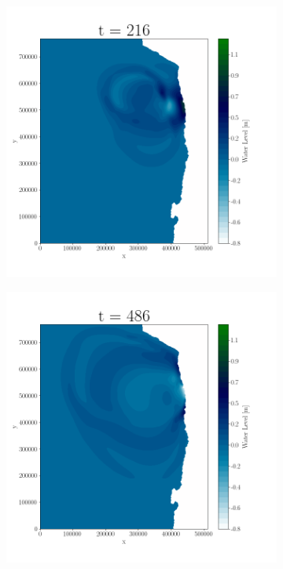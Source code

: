 \begin{figure}[H]
\begin{subfigure}[b]{.4\linewidth}
\includegraphics[width=\linewidth]{Figures/1-3.png}
\caption{}
\end{subfigure}
\begin{subfigure}[b]{.4\linewidth}
\includegraphics[width=\linewidth]{Figures/1-4.png}
\caption{}
\end{subfigure}


\end{figure}
